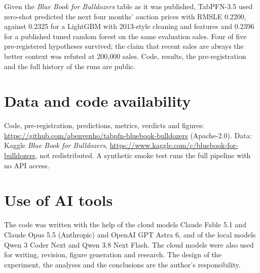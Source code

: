 \documentclass[11pt,a4paper]{article}
\begin{document}
Given the \emph{Blue Book for Bulldozers} table as it was published, TabPFN-3.5 used zero-shot predicted the next four months' auction prices with RMSLE 0.2200, against 0.2325 for a LightGBM with 2013-style cleaning and features and 0.2396 for a published tuned random forest on the same evaluation sales. Four of five pre-registered hypotheses survived; the claim that recent sales are always the better context was refuted at 200,000 sales. Code, results, the pre-registration and the full history of the runs are public.

\section*{Data and code availability}

Code, pre-registration, predictions, metrics, verdicts and figures: \url{https://github.com/abenvenho/tabpfn-bluebook-bulldozers} (Apache-2.0). Data: Kaggle \emph{Blue Book for Bulldozers}, \url{https://www.kaggle.com/c/bluebook-for-bulldozers}, not redistributed. A synthetic smoke test runs the full pipeline with no API access.

\section*{Use of AI tools}

The code was written with the help of the cloud models Claude Fable 5.1 and Claude Opus 5.5 (Anthropic) and OpenAI GPT Astra 6, and of the local models Qwen 3 Coder Next and Qwen 3.8 Next Flash. The cloud models were also used for writing, revision, figure generation and research. The design of the experiment, the analyses and the conclusions are the author's responsibility.
\end{document}
